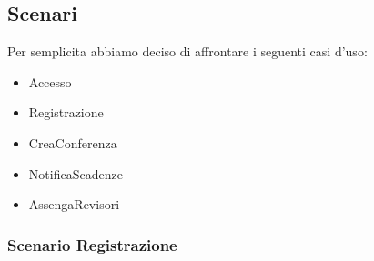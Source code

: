 \subsection{Scenari}
\label{sec:scenari}
Per semplicita abbiamo deciso di affrontare i seguenti casi d'uso:
\begin{itemize}
  \item Accesso
\item Registrazione
\item CreaConferenza
\item NotificaScadenze
\item AssengaRevisori
\end{itemize}


\subsubsection{Scenario Registrazione}
\label{sec:scenari:registrazione}
